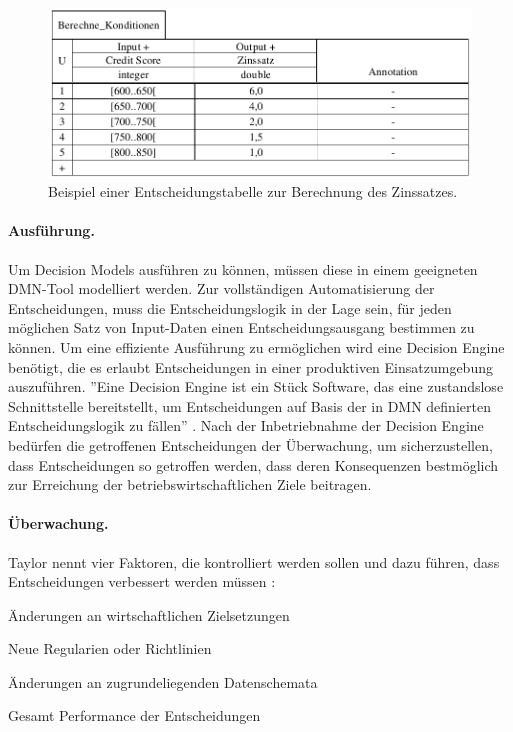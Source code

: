 \begin{figure}[ht]
\centering
\includegraphics{images/decisiontable.pdf}
\caption{Beispiel einer Entscheidungstabelle zur Berechnung des Zinssatzes.}
\label{fig:decisiontable}
\end{figure} 

\paragraph{Ausführung.} Um Decision Models ausführen zu können, müssen diese in einem geeigneten DMN-Tool modelliert werden. Zur vollständigen Automatisierung der Entscheidungen, muss die Entscheidungslogik in der Lage sein, für jeden möglichen Satz von Input-Daten einen
Entscheidungsausgang bestimmen zu können. Um eine effiziente Ausführung zu ermöglichen wird eine Decision Engine benötigt, die es erlaubt Entscheidungen in einer produktiven Einsatzumgebung auszuführen. ''Eine Decision Engine ist ein Stück Software, das eine zustandslose Schnittstelle bereitstellt, um Entscheidungen auf Basis der in DMN definierten Entscheidungslogik zu fällen'' \cite[S. 41]{BR16}. Nach der Inbetriebnahme der Decision Engine bedürfen die getroffenen Entscheidungen der Überwachung, um sicherzustellen, dass Entscheidungen so getroffen werden, dass deren Konsequenzen bestmöglich zur Erreichung der betriebswirtschaftlichen Ziele beitragen. 

\paragraph{Überwachung.} Taylor nennt vier Faktoren, die kontrolliert werden sollen und dazu führen, dass Entscheidungen verbessert werden müssen \cite[vgl. S. 158]{JT11}:

\begin{enumerate*}
\item Änderungen an wirtschaftlichen Zielsetzungen
\item Neue Regularien oder Richtlinien
\item Änderungen an zugrundeliegenden Datenschemata  
\item Gesamt Performance der Entscheidungen\end{enumerate*}   

